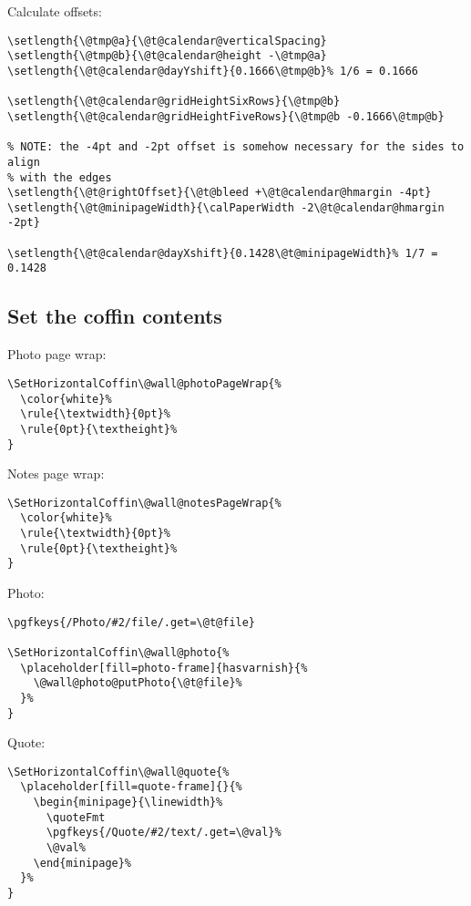 \documentclass[11pt,oneside]{memoir-article}
\begin{document}
Calculate offsets:

\begin{verbatim}
\setlength{\@tmp@a}{\@t@calendar@verticalSpacing}
\setlength{\@tmp@b}{\@t@calendar@height -\@tmp@a}
\setlength{\@t@calendar@dayYshift}{0.1666\@tmp@b}% 1/6 = 0.1666

\setlength{\@t@calendar@gridHeightSixRows}{\@tmp@b}
\setlength{\@t@calendar@gridHeightFiveRows}{\@tmp@b -0.1666\@tmp@b}

% NOTE: the -4pt and -2pt offset is somehow necessary for the sides to align
% with the edges
\setlength{\@t@rightOffset}{\@t@bleed +\@t@calendar@hmargin -4pt}
\setlength{\@t@minipageWidth}{\calPaperWidth -2\@t@calendar@hmargin -2pt}

\setlength{\@t@calendar@dayXshift}{0.1428\@t@minipageWidth}% 1/7 = 0.1428
\end{verbatim}

\subsection{Set the coffin contents}
\label{sec:org1896949}

Photo page wrap:

\begin{verbatim}
\SetHorizontalCoffin\@wall@photoPageWrap{%
  \color{white}%
  \rule{\textwidth}{0pt}%
  \rule{0pt}{\textheight}%
}
\end{verbatim}

Notes page wrap:

\begin{verbatim}
\SetHorizontalCoffin\@wall@notesPageWrap{%
  \color{white}%
  \rule{\textwidth}{0pt}%
  \rule{0pt}{\textheight}%
}
\end{verbatim}

Photo:

\begin{verbatim}
\pgfkeys{/Photo/#2/file/.get=\@t@file}

\SetHorizontalCoffin\@wall@photo{%
  \placeholder[fill=photo-frame]{hasvarnish}{%
    \@wall@photo@putPhoto{\@t@file}%
  }%
}
\end{verbatim}

Quote:

\begin{verbatim}
\SetHorizontalCoffin\@wall@quote{%
  \placeholder[fill=quote-frame]{}{%
    \begin{minipage}{\linewidth}%
      \quoteFmt
      \pgfkeys{/Quote/#2/text/.get=\@val}%
      \@val%
    \end{minipage}%
  }%
}
\end{verbatim}
\end{document}
